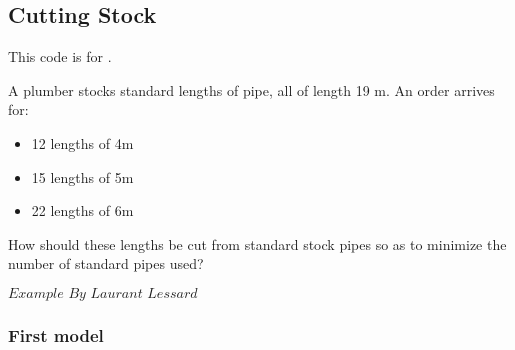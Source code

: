\subsection{Cutting Stock}
\label{code:cutting-pipe}
This code is for .
   

A plumber stocks standard lengths of pipe, all of length 19 m. An order
arrives for:

\begin{itemize}
\tightlist
\item
  12 lengths of 4m
\item
  15 lengths of 5m
\item
  22 lengths of 6m
\end{itemize}

How should these lengths be cut from standard stock pipes so as to
minimize the number of standard pipes used?

\(\textit{Example By Laurant Lessard}\)

    \hypertarget{first-model}{%
\subsubsection{First model}\label{first-model}}

